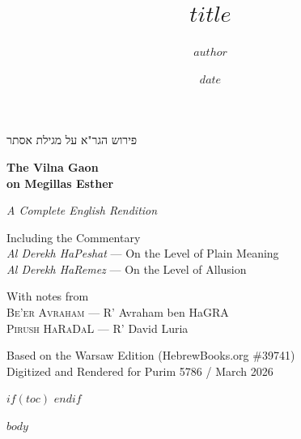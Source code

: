 \documentclass[11pt,twoside]{book}
\title{$title$}
\author{$author$}
\date{$date$}
\begin{document}
\begin{titlepage}
\begin{center}
\vspace*{1.2in}

{\hebrewfont\huge\begin{hebrew}פירוש הגר"א על מגילת אסתר\end{hebrew}}

\vspace{0.4in}

{\Huge\bfseries The Vilna Gaon\\[6pt]on Megillas Esther}

\vspace{0.35in}

{\large\itshape A Complete English Rendition}

\vspace{0.15in}

{\normalsize Including the Commentary\\[3pt]
\textit{Al Derekh HaPeshat} — On the Level of Plain Meaning\\
\textit{Al Derekh HaRemez} — On the Level of Allusion}

\vspace{0.35in}

{\small With notes from\\[4pt]
\textsc{Be'er Avraham} — R' Avraham ben HaGRA\\
\textsc{Pirush HaRaDaL} — R' David Luria}

\vspace{\fill}

{\footnotesize Based on the Warsaw Edition (HebrewBooks.org \#39741)\\[4pt]
Digitized and Rendered for Purim 5786 / March 2026}

\end{center}
\end{titlepage}

\cleardoublepage

\frontmatter
$if(toc)$
\tableofcontents
$endif$

\mainmatter

$body$
\end{document}
